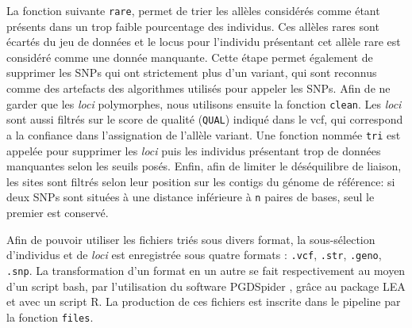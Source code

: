 La fonction suivante \verb|rare|, permet de trier les allèles considérés comme étant présents dans un trop faible pourcentage des individus. Ces allèles rares sont écartés du jeu de données et le locus pour l'individu présentant cet allèle rare est considéré comme une donnée manquante.
  Cette étape permet également de supprimer les SNPs qui ont strictement plus d'un variant, qui sont reconnus comme des artefacts des algorithmes utilisés pour appeler les SNPs.
Afin de ne garder que les \textit{loci} polymorphes, nous utilisons ensuite la fonction \verb|clean|. Les \textit{loci} sont aussi filtrés sur le score de qualité (\verb|QUAL|) indiqué dans le vcf, qui correspond a la confiance dans l'assignation de l'allèle variant.
 Une fonction nommée \verb|tri| est appelée pour supprimer les \textit{loci} puis les individus présentant trop de données manquantes selon les seuils posés.
 Enfin, afin de limiter le déséquilibre de liaison, les sites sont filtrés selon leur position sur les contigs du génome de référence: si deux SNPs sont situées à une distance inférieure à \verb|n| paires de bases, seul le premier est conservé.

Afin de pouvoir utiliser les fichiers triés sous divers format, la sous-sélection d'individus et de \textit{loci} est enregistrée sous quatre formats : \verb|.vcf|, \verb|.str|, \verb|.geno|, \verb|.snp|.
 La transformation d'un format en un autre se fait respectivement au moyen d'un script bash, par l'utilisation du software PGDSpider \citep{Lischer2012}, grâce au package LEA \citep{Frichot2015} et avec un script R.
 La production de ces fichiers est inscrite dans le pipeline par la fonction \verb|files|.

